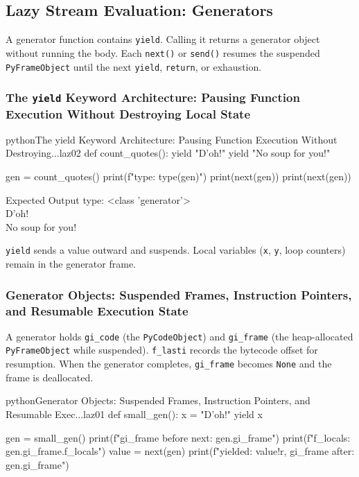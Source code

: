 \subsection{Lazy Stream Evaluation: Generators}

A generator function contains \texttt{yield}. Calling it returns a generator object without running the body. Each \texttt{next()} or \texttt{send()} resumes the suspended \texttt{PyFrameObject} until the next \texttt{yield}, \texttt{return}, or exhaustion.

\subsubsection{The \texttt{yield} Keyword Architecture: Pausing Function Execution Without Destroying Local State}

\begin{codebox}[]{python}{The yield Keyword Architecture: Pausing Function Execution Without Destroying...}{laz02}
def count_quotes():
    yield "D'oh!"
    yield "No soup for you!"

gen = count_quotes()
print(f"type: {type(gen)}")
print(next(gen))
print(next(gen))
\end{codebox}


\begin{iobox}{Expected Output}
type: <class 'generator'> \\
D'oh! \\
No soup for you! \\
\end{iobox}




\texttt{yield} sends a value outward and suspends. Local variables (\texttt{x}, \texttt{y}, loop counters) remain in the generator frame.

\subsubsection{Generator Objects: Suspended Frames, Instruction Pointers, and Resumable Execution State}

A generator holds \texttt{gi\_code} (the \texttt{PyCodeObject}) and \texttt{gi\_frame} (the heap-allocated \texttt{PyFrameObject} while suspended). \texttt{f\_lasti} records the bytecode offset for resumption. When the generator completes, \texttt{gi\_frame} becomes \texttt{None} and the frame is deallocated.

\begin{codebox}[]{python}{Generator Objects: Suspended Frames, Instruction Pointers, and Resumable Exec...}{laz01}
def small_gen():
    x = "D'oh!"
    yield x

gen = small_gen()
print(f"gi_frame before next: {gen.gi_frame}")
print(f"f_locals: {gen.gi_frame.f_locals}")
value = next(gen)
print(f"yielded: {value!r}, gi_frame after: {gen.gi_frame}")
\end{codebox}


